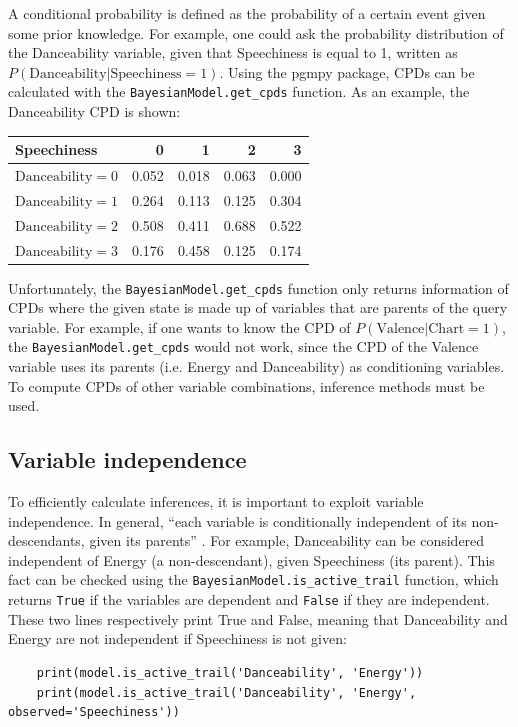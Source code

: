 \documentclass[a4paper, 12pt]{article}
\begin{document}
A conditional probability is defined as the probability of a certain event given some prior knowledge. For example, one could ask the probability distribution of the Danceability variable, given that Speechiness is equal to 1, written as $P\left(\mathrm{Danceability} | \mathrm{Speechiness} = 1\right)$. Using the pgmpy package, CPDs can be calculated with the \verb|BayesianModel.get_cpds| function. As an example, the Danceability CPD is shown:
\begin{center}
    \begin{tabular}{lrrrr}
        \toprule
        Speechiness                 & 0     & 1     & 2     & 3 \\
        \midrule
        $\mathrm{Danceability} = 0$ & 0.052 & 0.018 & 0.063 & 0.000 \\
        $\mathrm{Danceability} = 1$ & 0.264 & 0.113 & 0.125 & 0.304 \\
        $\mathrm{Danceability} = 2$ & 0.508 & 0.411 & 0.688 & 0.522 \\
        $\mathrm{Danceability} = 3$ & 0.176 & 0.458 & 0.125 & 0.174 \\
        \bottomrule
    \end{tabular}
\end{center}

Unfortunately, the \verb|BayesianModel.get_cpds| function only returns information of CPDs where the given state is made up of variables that are parents of the query variable. For example, if one wants to know the CPD of $P\left(\mathrm{Valence} | \mathrm{Chart} = 1\right)$, the \verb|BayesianModel.get_cpds| would not work, since the CPD of the Valence variable uses its parents (i.e. Energy and Danceability) as conditioning variables. To compute CPDs of other variable combinations, inference methods must be used.


\subsection{Variable independence}

To efficiently calculate inferences, it is important to exploit variable independence. In general, ``each variable is conditionally independent of its non-descendants, given its parents'' \cite{probabilistic-reasoning}. For example, Danceability can be considered independent of Energy (a non-descendant), given Speechiness (its parent). This fact can be checked using the \verb|BayesianModel.is_active_trail| function, which returns \verb|True| if the variables are dependent and \verb|False| if they are independent. These two lines respectively print True and False, meaning that Danceability and Energy are not independent if Speechiness is not given:
\begin{verbatim}
    print(model.is_active_trail('Danceability', 'Energy'))
    print(model.is_active_trail('Danceability', 'Energy', observed='Speechiness'))
\end{verbatim}
\end{document}
